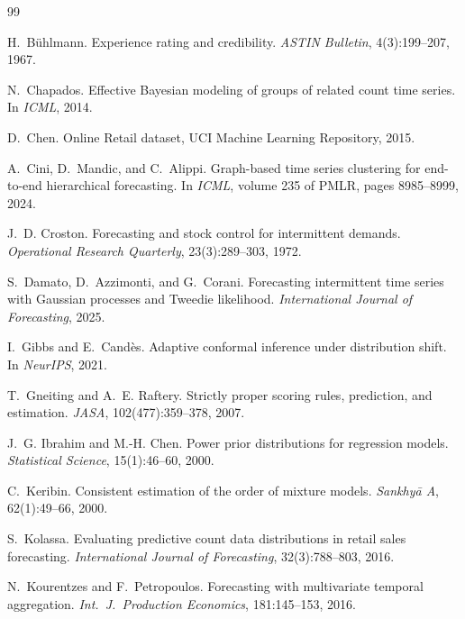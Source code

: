 \documentclass[twoside]{article}
\theoremstyle{definition}
\begin{document}
\begin{thebibliography}{99}

H.~B\"uhlmann.
\newblock Experience rating and credibility.
\newblock \emph{ASTIN Bulletin}, 4(3):199--207, 1967.

N.~Chapados.
\newblock Effective Bayesian modeling of groups of related count time series.
\newblock In \emph{ICML}, 2014.

D.~Chen.
\newblock Online Retail dataset, UCI Machine Learning Repository, 2015.

A.~Cini, D.~Mandic, and C.~Alippi.
\newblock Graph-based time series clustering for end-to-end hierarchical
  forecasting.
\newblock In \emph{ICML}, volume 235 of PMLR, pages 8985--8999, 2024.

J.~D. Croston.
\newblock Forecasting and stock control for intermittent demands.
\newblock \emph{Operational Research Quarterly}, 23(3):289--303, 1972.

S.~Damato, D.~Azzimonti, and G.~Corani.
\newblock Forecasting intermittent time series with Gaussian processes and
  Tweedie likelihood.
\newblock \emph{International Journal of Forecasting}, 2025.

I.~Gibbs and E.~Cand\`es.
\newblock Adaptive conformal inference under distribution shift.
\newblock In \emph{NeurIPS}, 2021.

T.~Gneiting and A.~E. Raftery.
\newblock Strictly proper scoring rules, prediction, and estimation.
\newblock \emph{JASA}, 102(477):359--378, 2007.

J.~G. Ibrahim and M.-H. Chen.
\newblock Power prior distributions for regression models.
\newblock \emph{Statistical Science}, 15(1):46--60, 2000.

C.~Keribin.
\newblock Consistent estimation of the order of mixture models.
\newblock \emph{Sankhy\=a A}, 62(1):49--66, 2000.

S.~Kolassa.
\newblock Evaluating predictive count data distributions in retail sales
  forecasting.
\newblock \emph{International Journal of Forecasting}, 32(3):788--803, 2016.

N.~Kourentzes and F.~Petropoulos.
\newblock Forecasting with multivariate temporal aggregation.
\newblock \emph{Int.\ J.\ Production Economics}, 181:145--153, 2016.


\end{thebibliography}
\end{document}
